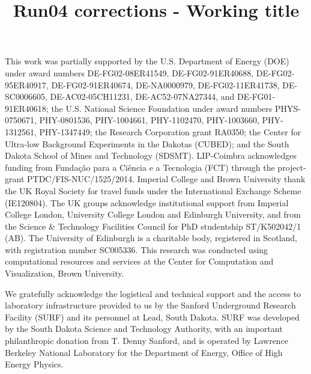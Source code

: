 \documentclass[twocolumn,superscriptaddress,prd]{revtex4-1}
\begin{document}
\title{Run04 corrections - Working title}





\maketitle









\appendix

%


\begin{acknowledgments}

This work was partially supported by the U.S. Department of Energy (DOE) under award numbers DE-FG02-08ER41549, DE-FG02-91ER40688, DE-FG02-95ER40917, DE-FG02-91ER40674, DE-NA0000979, DE-FG02-11ER41738, DE-SC0006605, DE-AC02-05CH11231, DE-AC52-07NA27344, and DE-FG01-91ER40618; the U.S. National Science Foundation under award numbers PHYS-0750671, PHY-0801536, PHY-1004661, PHY-1102470, PHY-1003660, PHY-1312561, PHY-1347449; the Research Corporation grant RA0350; the Center for Ultra-low Background Experiments in the Dakotas (CUBED); and the South Dakota School of Mines and Technology (SDSMT). LIP-Coimbra acknowledges funding from Funda\c{c}\~{a}o para a Ci\^{e}ncia e a Tecnologia (FCT)   through the project-grant PTDC/FIS-NUC/1525/2014. Imperial College and Brown University thank the UK Royal Society for travel funds under the International Exchange Scheme (IE120804). The UK groups acknowledge institutional support from Imperial College London, University College London and Edinburgh University, and from the Science \& Technology Facilities Council for PhD studentship ST/K502042/1 (AB). The University of Edinburgh is a charitable body, registered in Scotland, with registration number SC005336. This research was conducted using computational resources and services at the Center for Computation and Visualization, Brown University.

We gratefully acknowledge the logistical and technical support and the access to laboratory infrastructure provided to us by the Sanford Underground Research Facility (SURF) and its personnel at Lead, South Dakota. SURF was developed by the South Dakota Science and Technology Authority, with an important philanthropic donation from T. Denny Sanford, and is operated by Lawrence Berkeley National Laboratory for the Department of Energy, Office of High Energy Physics.

\end{acknowledgments}


\newpage
\thispagestyle{empty}
\mbox{}
\newpage
\thispagestyle{empty}
\mbox{}

%


\end{document}
